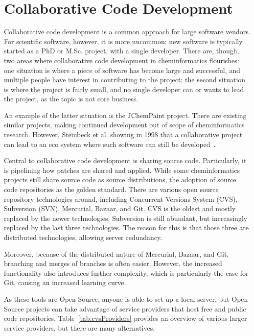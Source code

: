 \documentclass[12pt]{book}
\begin{document}
\section{Collaborative Code Development}

Collaborative code development is a common approach for large software vendors.
For scientific software, however, it is more uncommon: new software is typically
started as a PhD or M.Sc. project, with a single developer. There are, though,
two areas where collaborative code development in cheminformatics flourishes:
one situation is where a piece of software has become large and successful,
and multiple people have interest in contributing to the project; the second
situation is where the project is fairly small, and no single developer can
or wants to lead the project, as the topic is not core business.

An example of the latter situation is the JChemPaint project. There are existing
similar projects, making continued development out of scope of cheminformatics
research. However, Steinbeck et al. showing in 1998 that a collaborative project
can lead to an eco system where such software can still be
developed~\cite{Krause2000}.

Central to collaborative code development is sharing source code. Particularly,
it is pipelining how patches are shared and applied. While some cheminformatics
projects still share source code as source distributions, the adoption of
source code repositories as the golden standard. There are various 
open source repository technologies around, including Concurrent Versions System (CVS),
Subversion (SVN), Mercurial, Bazaar, and Git. CVS is the oldest and mostly replaced
by the newer technologies. Subversion is still abundant, but increasingly
replaced by the last three technologies. The reason for this is that
those three are distributed technologies, allowing server redundancy.

Moreover, because of the distributed nature of Mercurial, Bazaar, and Git,
branching and merges of branches is often easier. However, the increased
functionality also introduces further complexity, which is particularly
the case for Git, causing an increased learning curve.

As these tools are Open Source, anyone is able to set up a local server, but
Open Source projects can take advantage of service providers that host
free and public code repositories. Table~\ref{tab:cvsProviders}
provides an overview of various larger service providers, but there
are many alternatives.
\end{document}
